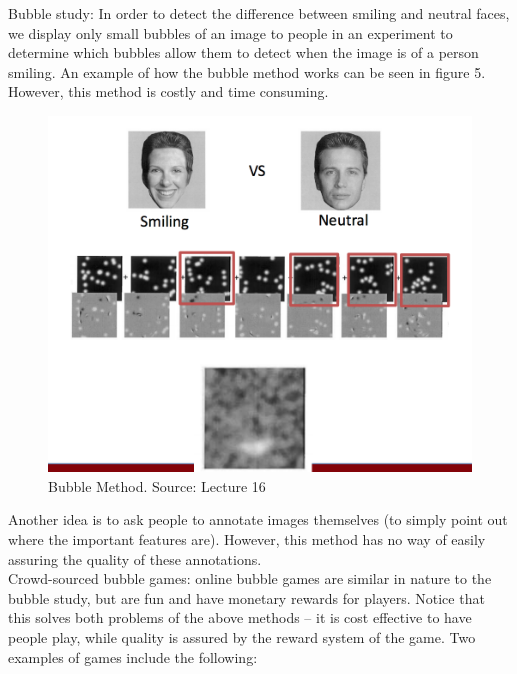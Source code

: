 \documentclass[11pt]{article}
\begin{document}
Bubble study: In order to detect the difference between smiling and neutral faces, we display only small bubbles of an image to people in an experiment to determine which bubbles allow them to detect when the image is of a person smiling. An example of how the bubble method works can be seen in figure 5. However, this method is costly and time consuming. \\
\begin{figure}[h]
  \centering
  \includegraphics[scale=0.6]{bubblestudy.png}
  \caption{Bubble Method. Source: Lecture 16}
\end{figure}
Another idea is to ask people to annotate images themselves (to simply point out where the important features are). However, this method has no way of easily assuring the quality of these annotations. \\
Crowd-sourced bubble games: online bubble games are similar in nature to the bubble study, but are fun and have monetary rewards for players. Notice that this solves both problems of the above methods -- it is cost effective to have people play, while quality is assured by the reward system of the game. Two examples of games include the following:
\end{document}
